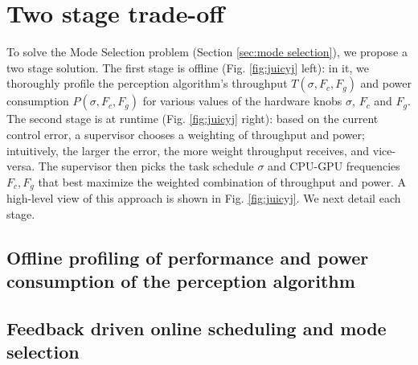 \section{Two stage trade-off}
\label{sec:twoStage}
To solve the Mode Selection problem (Section \ref{sec:mode selection}), we propose a two stage solution. 
The first stage is offline (Fig. \ref{fig:juicyj} left): in it, we thoroughly profile the perception algorithm's throughput $T(\sigma,F_c,F_g)$ and power consumption $P(\sigma,F_c,F_g)$ for various values of the hardware knobs $\sigma$, $F_c$ and $F_g$. 
The second stage is at runtime (Fig. \ref{fig:juicyj} right): based on the current control error, a supervisor chooses a weighting of throughput and power; intuitively, the larger the error, the more weight throughput receives, and vice-versa.
The supervisor then picks the task schedule $\sigma$ and CPU-GPU frequencies $F_c,F_g$ that best maximize the weighted combination of throughput and power.
A high-level view of this approach is shown in Fig. \ref{fig:juicyj}. 
We next detail each stage.

\subsection{Offline profiling of performance and power consumption of the perception algorithm}
\label{sec:profiling}


\subsection{Feedback driven online scheduling and mode selection}
\label{sec:scheduling}


